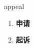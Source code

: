 
\begin{frame}
{\huge appeal}
\begin{center}
\begin{enumerate}\Large
  \item \textbf{申请}
  \item \textbf{起诉}
\end{enumerate}
\end{center}
\end{frame}
